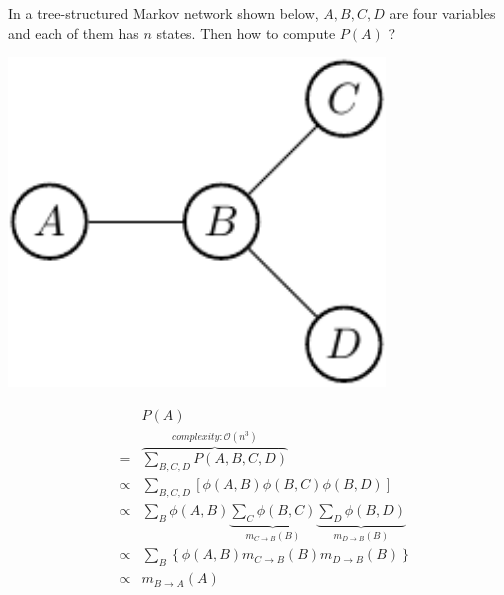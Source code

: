 In a tree-structured Markov network shown below, $A,B,C,D$ are four variables and each of them has $n$ states. Then how to compute $P(A)$ ?
\newline 
\begin{minipage}[c]{0.4\textwidth}
      \centering
      \includegraphics[width=0.75\textwidth]{./Figures/message_passing}
\end{minipage}
\begin{minipage}[c]{0.6\textwidth}
 \begin{equation*}
  \begin{array}{rcl}
  & & P(A) \\
  &=& \overbrace{\sum_{B,C,D}P(A,B,C,D)}^{complexity:  \mathcal{O}(n^{3})} \\
  &\propto& \sum_{B,C,D} \left[ \phi(A,B) \phi(B,C) \phi(B,D) \right] \\
  &\propto& \sum_{B}\phi(A,B) \underbrace{\sum_C \phi(B,C)}_{m_{C\rightarrow B}(B)} \underbrace{\sum_D \phi(B,D)}_{m_{D\rightarrow B}(B)}\\ 
  &\propto& \sum_{B} \left\{\phi(A,B) m_{C\rightarrow B}(B) m_{D\rightarrow B}(B) \right\} \\
  &\propto& m_{B\rightarrow A}(A)
  \end{array}
 \end{equation*}
\end{minipage}
\newline 

